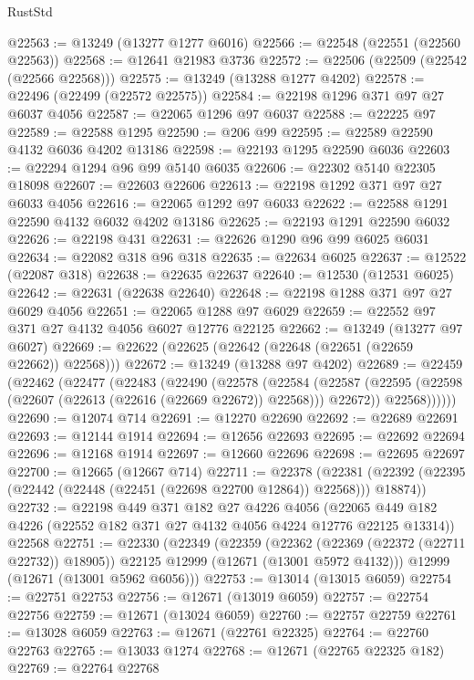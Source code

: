 \begin{lexlean}{RustStd}
\begin{coremodule}
@22563 := @13249 (@13277 @1277 @6016)
@22566 := @22548 (@22551 (@22560 @22563))
@22568 := @12641 @21983 @3736
@22572 := @22506 (@22509 (@22542 (@22566 @22568)))
@22575 := @13249 (@13288 @1277 @4202)
@22578 := @22496 (@22499 (@22572 @22575))
@22584 := @22198 @1296 @371 @97 @27 @6037 @4056
@22587 := @22065 @1296 @97 @6037
@22588 := @22225 @97
@22589 := @22588 @1295
@22590 := @206 @99
@22595 := @22589 @22590 @4132 @6036 @4202 @13186
@22598 := @22193 @1295 @22590 @6036
@22603 := @22294 @1294 @96 @99 @5140 @6035
@22606 := @22302 @5140 @22305 @18098
@22607 := @22603 @22606
@22613 := @22198 @1292 @371 @97 @27 @6033 @4056
@22616 := @22065 @1292 @97 @6033
@22622 := @22588 @1291 @22590 @4132 @6032 @4202 @13186
@22625 := @22193 @1291 @22590 @6032
@22626 := @22198 @431
@22631 := @22626 @1290 @96 @99 @6025 @6031
@22634 := @22082 @318 @96 @318
@22635 := @22634 @6025
@22637 := @12522 (@22087 @318)
@22638 := @22635 @22637
@22640 := @12530 (@12531 @6025)
@22642 := @22631 (@22638 @22640)
@22648 := @22198 @1288 @371 @97 @27 @6029 @4056
@22651 := @22065 @1288 @97 @6029
@22659 := @22552 @97 @371 @27 @4132 @4056 @6027 @12776 @22125
@22662 := @13249 (@13277 @97 @6027)
@22669 := @22622 (@22625 (@22642 (@22648 (@22651 (@22659 @22662)) @22568)))
@22672 := @13249 (@13288 @97 @4202)
@22689 := @22459
    (@22462
      (@22477
        (@22483
          (@22490
            (@22578
              (@22584
                (@22587 (@22595 (@22598 (@22607 (@22613 (@22616 (@22669 @22672)) @22568))) @22672))
                @22568))))))
@22690 := @12074 @714
@22691 := @12270 @22690
@22692 := @22689 @22691
@22693 := @12144 @1914
@22694 := @12656 @22693
@22695 := @22692 @22694
@22696 := @12168 @1914
@22697 := @12660 @22696
@22698 := @22695 @22697
@22700 := @12665 (@12667 @714)
@22711 := @22378
    (@22381 (@22392 (@22395 (@22442 (@22448 (@22451 (@22698 @22700 @12864)) @22568))) @18874))
@22732 := @22198
    @449
    @371
    @182
    @27
    @4226
    @4056
    (@22065 @449 @182 @4226 (@22552 @182 @371 @27 @4132 @4056 @4224 @12776 @22125 @13314))
    @22568
@22751 := @22330
    (@22349
      (@22359
        (@22362 (@22369 (@22372 (@22711 @22732)) @18905))
        @22125
        @12999
        (@12671 (@13001 @5972 @4132)))
      @12999
      (@12671 (@13001 @5962 @6056)))
@22753 := @13014 (@13015 @6059)
@22754 := @22751 @22753
@22756 := @12671 (@13019 @6059)
@22757 := @22754 @22756
@22759 := @12671 (@13024 @6059)
@22760 := @22757 @22759
@22761 := @13028 @6059
@22763 := @12671 (@22761 @22325)
@22764 := @22760 @22763
@22765 := @13033 @1274
@22768 := @12671 (@22765 @22325 @182)
@22769 := @22764 @22768

\end{coremodule}
\end{lexlean}
